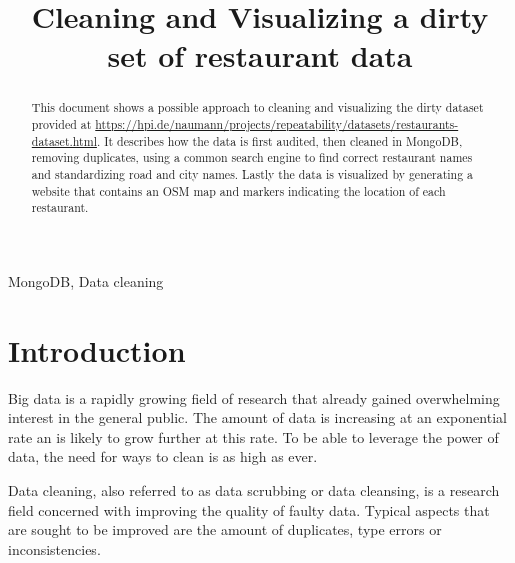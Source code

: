 \documentclass[conference]{IEEEtran}
\begin{document}
\title{Cleaning and Visualizing a dirty set of restaurant data}


\author{
}

\maketitle

\begin{abstract}
This document shows a possible approach to cleaning and visualizing the dirty dataset provided at \url{https://hpi.de/naumann/projects/repeatability/datasets/restaurants-dataset.html}. It describes how the data is first audited, then cleaned in MongoDB, removing duplicates, using a common search engine to find correct restaurant names and standardizing road and city names. Lastly the data is visualized by generating a website that contains an OSM map and markers indicating the location of each restaurant.
\end{abstract}

\begin{IEEEkeywords}
MongoDB, Data cleaning
\end{IEEEkeywords}

\section{Introduction}
Big data is a rapidly growing field of research that already gained overwhelming interest in the general public. The amount of data is increasing at an exponential rate an is likely to grow further at this rate. To be able to leverage the power of data, the need for ways to clean is as high as ever.

Data cleaning, also referred to as data scrubbing or data cleansing, is a research field concerned with improving the quality of faulty data. Typical aspects that are sought to be improved are the amount of duplicates, type errors or inconsistencies\cite{Bilenko.2003}.
\end{document}
